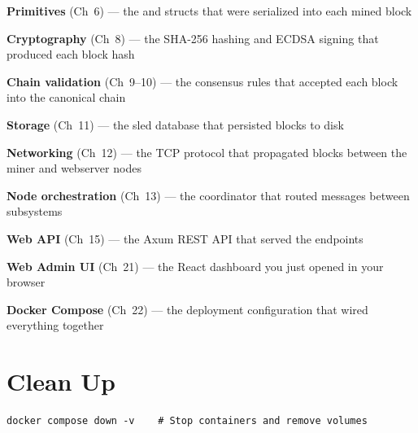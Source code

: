 \begin{chaptersummary}
  \item \textbf{Primitives} (Ch~6) --- the  and  structs that were
        serialized into each mined block
  \item \textbf{Cryptography} (Ch~8) --- the SHA-256 hashing and ECDSA signing that produced each
        block hash
  \item \textbf{Chain validation} (Ch~9--10) --- the consensus rules that accepted each block
        into the canonical chain
  \item \textbf{Storage} (Ch~11) --- the sled database that persisted blocks to disk
  \item \textbf{Networking} (Ch~12) --- the TCP protocol that propagated blocks between the miner
        and webserver nodes
  \item \textbf{Node orchestration} (Ch~13) --- the coordinator that routed messages between
        subsystems
  \item \textbf{Web API} (Ch~15) --- the Axum REST API that served the 
        endpoints
  \item \textbf{Web Admin UI} (Ch~21) --- the React dashboard you just opened in your browser
  \item \textbf{Docker Compose} (Ch~22) --- the deployment configuration that wired everything
        together
\end{chaptersummary}

\section{Clean Up}
\label{sec:cleanup}

\begin{verbatim}
docker compose down -v    # Stop containers and remove volumes
\end{verbatim}

